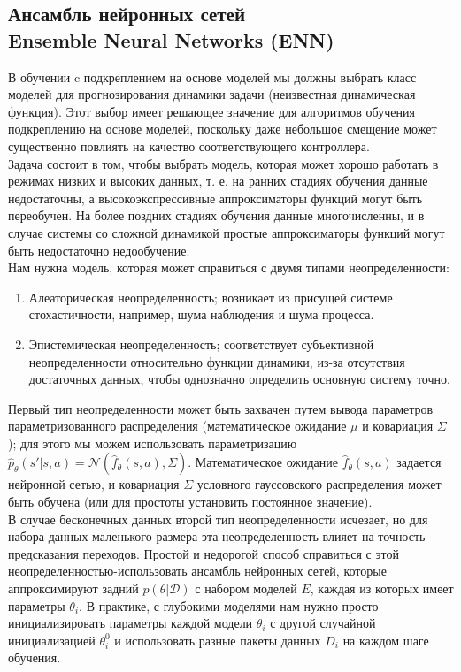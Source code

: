 \documentclass[a4paper,12pt]{article}
\begin{document}
\subsection{Ансамбль нейронных сетей\\
Ensemble Neural Networks (ENN)}
В обучении c подкреплением на основе моделей мы должны выбрать класс моделей для прогнозирования динамики задачи (неизвестная динамическая функция). Этот выбор имеет решающее значение для алгоритмов обучения подкреплению на основе моделей, поскольку даже небольшое смещение может существенно повлиять на качество соответствующего контроллера.\\

Задача состоит в том, чтобы выбрать модель, которая может хорошо работать в режимах низких и высоких данных, т. е. на ранних стадиях обучения данные недостаточны, а высокоэкспрессивные аппроксиматоры функций могут быть переобучен. На более поздних стадиях обучения данные многочисленны, и в случае системы со сложной динамикой простые аппроксиматоры функций могут быть недостаточно недообучение.\\
\newpage
Нам нужна модель, которая может справиться с двумя типами неопределенности:
\begin{enumerate}
    \item Алеаторическая неопределенность; возникает из присущей системе стохастичности, например, шума наблюдения и шума процесса.
\item Эпистемическая неопределенность; соответствует субъективной неопределенности относительно функции динамики, из-за отсутствия достаточных данных, чтобы однозначно определить основную систему точно.
\end{enumerate}

Первый тип неопределенности может быть захвачен путем вывода параметров параметризованного распределения (математическое ожидание $\mu$ и ковариация $\Sigma$); для этого мы можем использовать параметризацию $\hat{p}_\theta(s'|s, a)=\mathcal{N}(\hat{f}_\theta(s,a),\Sigma)$.
Математическое ожидание $\hat{f}_\theta (s,a)$ задается нейронной сетью, и ковариация $\Sigma$ условного гауссовского распределения может быть обучена (или для простоты установить постоянное значение).\\

В случае бесконечных данных второй тип неопределенности исчезает, но для набора данных маленького размера эта неопределенность влияет на точность предсказания переходов. Простой и недорогой способ справиться с этой неопределенностью-использовать ансамбль нейронных сетей, которые аппроксимируют задний $p (\theta | \mathcal{D})$ с набором моделей $E$, каждая из которых имеет параметры $\theta_i$. 
В практике, с глубокими моделями нам нужно просто инициализировать параметры каждой модели $\theta_i$ с другой случайной инициализацией $\theta_i^0$ и использовать разные пакеты данных $D_i$ на каждом шаге обучения.
\end{document}
